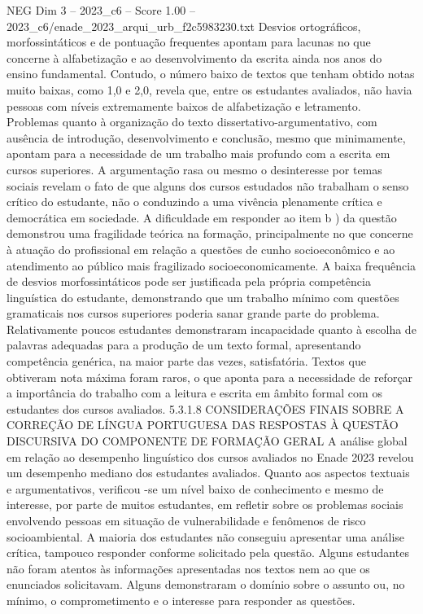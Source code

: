 \begin{textsample}{NEG Dim 3 – 2023\_c6 – Score 1.00 – 2023\_c6/enade\_2023\_arqui\_urb\_f2c5983230.txt}
Desvios ortográficos, morfossintáticos e de pontuação frequentes apontam para lacunas no que concerne à alfabetização e ao desenvolvimento da escrita ainda nos anos do ensino fundamental.
Contudo, o número baixo de textos que tenham obtido notas muito baixas, como 1,0 e 2,0, revela que, entre os estudantes avaliados, não havia pessoas com níveis extremamente baixos de alfabetização e letramento.
Problemas quanto à organização do texto dissertativo-argumentativo, com ausência de introdução, desenvolvimento e conclusão, mesmo que minimamente, apontam para a necessidade de um trabalho mais profundo com a escrita em cursos superiores.
A argumentação rasa ou mesmo o desinteresse por temas sociais revelam o fato de que alguns dos cursos estudados não trabalham o senso crítico do estudante, não o conduzindo a uma vivência plenamente crítica e democrática em sociedade.
A dificuldade em responder ao item b ) da questão demonstrou uma fragilidade teórica na formação, principalmente no que concerne à atuação do profissional em relação a questões de cunho socioeconômico e ao atendimento ao público mais fragilizado socioeconomicamente.
A baixa frequência de desvios morfossintáticos pode ser justificada pela própria competência linguística do estudante, demonstrando que um trabalho mínimo com questões gramaticais nos cursos superiores poderia sanar grande parte do problema.
Relativamente poucos estudantes demonstraram incapacidade quanto à escolha de palavras adequadas para a produção de um texto formal, apresentando competência genérica, na maior parte das vezes, satisfatória.
Textos que obtiveram nota máxima foram raros, o que aponta para a necessidade de reforçar a importância do trabalho com a leitura e escrita em âmbito formal com os estudantes dos cursos avaliados. 5.3.1.8 CONSIDERAÇÕES FINAIS SOBRE A CORREÇÃO DE LÍNGUA PORTUGUESA DAS RESPOSTAS À QUESTÃO DISCURSIVA DO COMPONENTE DE FORMAÇÃO GERAL A análise global em relação ao desempenho linguístico dos cursos avaliados no Enade 2023 revelou um desempenho mediano dos estudantes avaliados.
Quanto aos aspectos textuais e argumentativos, verificou -se um nível baixo de conhecimento e mesmo de interesse, por parte de muitos estudantes, em refletir sobre os problemas sociais envolvendo pessoas em situação de vulnerabilidade e fenômenos de risco socioambiental.
A maioria dos estudantes não conseguiu apresentar uma análise crítica, tampouco responder conforme solicitado pela questão.
Alguns estudantes não foram atentos às informações apresentadas nos textos nem ao que os enunciados solicitavam.
Alguns demonstraram o domínio sobre o assunto ou, no mínimo, o comprometimento e o interesse para responder as questões.

\end{textsample}
